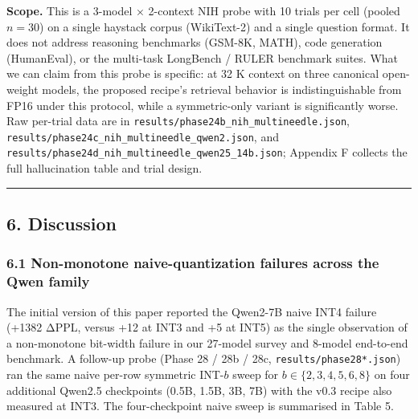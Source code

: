 \textbf{Scope.} This is a 3-model × 2-context NIH probe with 10 trials
per cell (pooled \(n = 30\)) on a single haystack corpus (WikiText-2)
and a single question format. It does not address reasoning benchmarks
(GSM-8K, MATH), code generation (HumanEval), or the multi-task LongBench
/ RULER benchmark suites. What we can claim from this probe is specific:
at 32 K context on three canonical open-weight models, the proposed
recipe's retrieval behavior is indistinguishable from FP16 under this
protocol, while a symmetric-only variant is significantly worse. Raw
per-trial data are in \texttt{results/phase24b\_nih\_multineedle.json},
\texttt{results/phase24c\_nih\_multineedle\_qwen2.json}, and
\texttt{results/phase24d\_nih\_multineedle\_qwen25\_14b.json}; Appendix
F collects the full hallucination table and trial design.

\begin{center}\rule{0.5\linewidth}{0.5pt}\end{center}

\subsection{6. Discussion}\label{discussion}

\subsubsection{6.1 Non-monotone naive-quantization failures across the
Qwen
family}\label{non-monotone-naive-quantization-failures-across-the-qwen-family}

The initial version of this paper reported the Qwen2-7B naive INT4
failure (+1382 ΔPPL, versus +12 at INT3 and +5 at INT5) as the single
observation of a non-monotone bit-width failure in our 27-model survey
and 8-model end-to-end benchmark. A follow-up probe (Phase 28 / 28b /
28c, \texttt{results/phase28*.json}) ran the same naive per-row
symmetric INT-\(b\) sweep for \(b \in \{2, 3, 4, 5, 6, 8\}\) on four
additional Qwen2.5 checkpoints (0.5B, 1.5B, 3B, 7B) with the v0.3 recipe
also measured at INT3. The four-checkpoint naive sweep is summarised in
Table 5.

